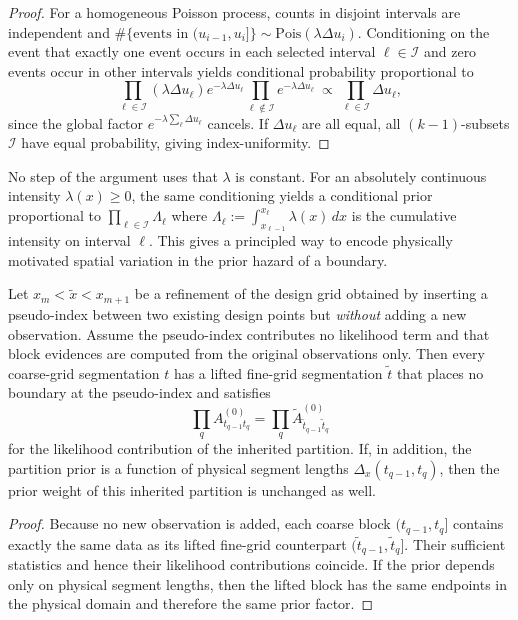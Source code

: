 \begin{proof}
For a homogeneous Poisson process, counts in disjoint intervals are independent and
$\#\{\text{events in }(u_{i-1},u_i]\}\sim\mathrm{Pois}(\lambda\Delta u_i)$. Conditioning on
the event that exactly one event occurs in each selected interval $\ell\in\mathcal{I}$ and
zero events occur in other intervals yields conditional probability proportional to
\[
\prod_{\ell\in\mathcal{I}} (\lambda\Delta u_\ell)e^{-\lambda\Delta u_\ell}
\prod_{\ell\notin\mathcal{I}} e^{-\lambda\Delta u_\ell}
\ \propto\ \prod_{\ell\in\mathcal{I}} \Delta u_\ell,
\]
since the global factor $e^{-\lambda\sum_\ell \Delta u_\ell}$ cancels. If $\Delta u_\ell$ are
all equal, all $(k-1)$-subsets $\mathcal{I}$ have equal probability, giving index-uniformity.
\end{proof}

\begin{remark}
\label{rem:inhomog-pp}
No step of the argument uses that $\lambda$ is constant. For an absolutely continuous intensity
$\lambda(x)\ge 0$, the same conditioning yields a conditional prior proportional to
$\prod_{\ell\in\mathcal{I}}\Lambda_\ell$ where $\Lambda_\ell := \int_{x_{\ell-1}}^{x_\ell}\lambda(x)\,dx$
is the cumulative intensity on interval $\ell$. This gives a principled way to encode physically
motivated spatial variation in the prior hazard of a boundary.
\end{remark}

\begin{proposition}
\label{thm:refine}
Let $x_m<\tilde x<x_{m+1}$ be a refinement of the design grid obtained by inserting a pseudo-index
between two existing design points but \emph{without} adding a new observation. Assume the pseudo-index
contributes no likelihood term and that block evidences are computed from the original observations only.
Then every coarse-grid segmentation $t$ has a lifted fine-grid segmentation $\tilde t$ that places no
boundary at the pseudo-index and satisfies
\[
\prod_{q} A^{(0)}_{t_{q-1}t_q}
  = \prod_q \widetilde{A}^{(0)}_{\tilde t_{q-1}\tilde t_q}
\]
for the likelihood contribution of the inherited partition. If, in addition, the partition prior is a
function of physical segment lengths $\Delta_x(t_{q-1},t_q)$, then the prior weight of this inherited
partition is unchanged as well.
\end{proposition}

\begin{proof}
Because no new observation is added, each coarse block $(t_{q-1},t_q]$ contains exactly the same data as
its lifted fine-grid counterpart $(\tilde t_{q-1},\tilde t_q]$. Their sufficient statistics and hence their
likelihood contributions coincide. If the prior depends only on physical segment lengths, then the lifted
block has the same endpoints in the physical domain and therefore the same prior factor.
\end{proof}

